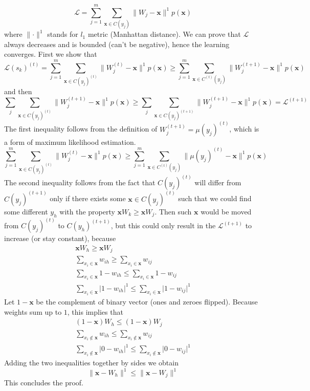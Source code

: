 \documentclass[12pt]{article}
\begin{document}
\[
\mathcal{L} = \sum_{j=1}^{m} \sum_{\boldsymbol{x}\in C(y_j)} \lVert  W_j - \boldsymbol{x}\rVert^1p(\boldsymbol{x})
\]
where $\lVert \cdot \rVert^1$ stands for $l_1$ metric (Manhattan distance). We can prove that $\mathcal{L}$ always decreases and is bounded (can't be negative), hence the learning converges. First we show that
\[
\mathcal{L}(s_k)^{(t)} =\sum_{j=1}^{m} \sum_{\boldsymbol{x}\in C(y_j)^{(t)}} \lVert  W_j^{(t)} - \boldsymbol{x}\rVert^1p(\boldsymbol{x})
\ge \sum_{j=1}^{m} \sum_{\boldsymbol{x}\in C^{(t)}(y_j)} \lVert  W_j^{(t+1)} - \boldsymbol{x}\rVert^1p(\boldsymbol{x})
\]
and then
\[
\sum_{j} \sum_{\boldsymbol{x}\in C(y_j)^{(t)}} \lVert W_j^{(t+1)} - \boldsymbol{x}\rVert^1 p(\boldsymbol{x}) \ge \sum_{j} \sum_{\boldsymbol{x}\in C(y_j)^{(t+1)}} \lVert W_j^{(t+1)}-\boldsymbol{x}\rVert^1 p(\boldsymbol{x}) = \mathcal{L}^{(t+1)}
\]
The first inequality follows from the definition of $W_j^{(t+1)} = \mu(y_j)^{(t)}$, which is a form of maximum likelihood estimation.
\[
\sum_{j=1}^{m} \sum_{\boldsymbol{x}\in C(y_j)^{(t)}} \lVert  W_j^{(t)} - \boldsymbol{x}\rVert^1p(\boldsymbol{x})
\ge \sum_{j=1}^{m} \sum_{\boldsymbol{x}\in C^{(t)}(y_j)} \lVert  \mu(y_j)^{(t)} - \boldsymbol{x}\rVert^1p(\boldsymbol{x})
\]
The second inequality follows from the fact that $C(y_j)^{(t)}$ will differ from $C(y_j)^{(t+1)}$ only if there exists some $\boldsymbol{x} \in C(y_j)^{(t)}$ such that we could find some different $y_h$ with the property $\boldsymbol{x} W_k \ge \boldsymbol{x} W_j$. Then such $\boldsymbol{x}$ would be moved from $C(y_j)^{(t)}$ to $C(y_h)^{(t+1)}$, but this could only result in the $\mathcal{L}^{(t+1)}$ to increase (or stay constant), because 
\begin{gather*}
	\boldsymbol{x} W_h \ge \boldsymbol{x} W_j \\
	\sum_{x_i\in\boldsymbol{x} }w_{ih} \ge \sum_{x_i\in\boldsymbol{x} }w_{ij} \\
	\sum_{x_i\in\boldsymbol{x} }1-w_{ih} \le \sum_{x_i\in\boldsymbol{x} }1-w_{ij} \\
	\sum_{x_i\in\boldsymbol{x} }\vert 1-w_{ih}\vert^1 \le \sum_{x_i\in\boldsymbol{x} }\vert 1-w_{ij}\vert^1
\end{gather*}
Let $1-\boldsymbol{x}$ be the complement of binary vector (ones and zeroes flipped). Because weights sum up to $1$, this implies that
\begin{gather*}
(1-\boldsymbol{x}) W_h \le (1-\boldsymbol{x}) W_j \\
\sum_{x_i\notin\boldsymbol{x} }w_{ih} \le \sum_{x_i\notin\boldsymbol{x} }w_{ij} \\
\sum_{x_i\notin\boldsymbol{x} }\vert 0-w_{ih}\vert^1 \le \sum_{x_i\notin\boldsymbol{x} }\vert 0-w_{ij}\vert^1
\end{gather*}
Adding the two inequalities together by sides we obtain
\[
	\lVert \boldsymbol{x} - W_h \rVert^1 \le \lVert  \boldsymbol{x} - W_j \rVert^1
\]
This concludes the proof.
\end{document}
